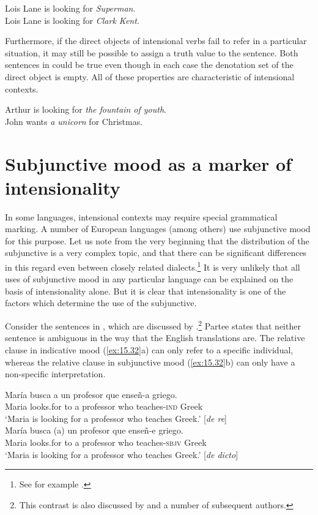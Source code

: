 \largerpage
\ea \label{ex:15.30}
\ea  Lois Lane is looking for \textit{Superman}.\\
\ex Lois Lane is looking for \textit{Clark Kent}.
                       \z
\z


Furthermore, if the direct objects of intensional verbs fail to refer in a particular situation, it may still be possible to assign a truth value to the sentence. Both sentences in  could be true even though in each case the denotation set of the direct object is empty. All of these properties are characteristic of intensional contexts.


\ea \label{ex:15.31}
\ea  Arthur is looking for \textit{the fountain of youth}.\\
\ex John wants \textit{a unicorn} for Christmas.
                       \z
\z

\section{Subjunctive mood as a marker of intensionality}\label{sec:15.5}

In some languages, intensional contexts may require special grammatical marking. A number of European languages (among others) use subjunctive mood for this purpose. Let us note from the very beginning that the distribution of the subjunctive is a very complex topic, and that there can be significant differences in this regard even between closely related dialects.\footnote{See for example \citet{Marques2004}.} It is very unlikely that all uses of subjunctive mood in any particular language can be explained on the basis of intensionality alone. But it is clear that intensionality is one of the factors which determine the use of the subjunctive.



Consider the  sentences in , which are discussed by \citet{Partee2008}.\footnote{This contrast is also discussed by \citet{Quine1956} and a number of subsequent authors.} Partee states that neither sentence is ambiguous in the way that the English translations are. The relative clause in indicative mood (\ref{ex:15.32}a) can only refer to a specific individual, whereas the relative clause in subjunctive mood (\ref{ex:15.32}b) can only have a non-specific interpretation.

\ea \label{ex:15.32}
\ea  \gll María  busca  a  un  profesor  que  enseñ-a  griego.\\
Maria  looks.for  to  a  professor  who  teaches-\textsc{ind}  {Greek}\\
\glt ‘Maria is looking for a professor who teaches {Greek}.’  \hfill   [\textit{de re}] \\
\medskip
\ex \gll María  busca  (a)  un  profesor  que  enseñ-e  griego.\\
Maria  looks.for  to  a  professor  who  teaches-\textsc{sbjv}  {Greek}\\
\glt ‘Maria is looking for a professor who teaches {Greek}.’  \hfill   [\textit{de dicto}]
\z \z


